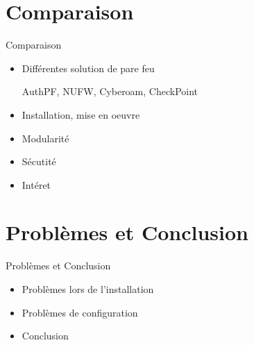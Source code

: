 \documentclass[t,12pt]{beamer}
\begin{document}
\section{Comparaison}                                                    %
\begin{frame}                                                         %
    \begin{center}{\textcolor{grisbleu}{\Large Comparaison}}\end{center} %
    \begin{itemize}                                                   %
	\item Différentes solution de pare feu
\begin{center}AuthPF, NUFW, Cyberoam, CheckPoint\end{center}
	\item Installation, mise en oeuvre
	\item Modularité
        \item Sécutité
        \item Intéret
\end{itemize}
\end{frame}                                                            %


\section{Problèmes et Conclusion}                                                    %
\begin{frame}                                                         %
    \begin{center}{\textcolor{grisbleu}{\Large Problèmes et Conclusion}}\end{center} %
    \begin{itemize}                                                   %
	\item Problèmes lors de l'installation
	\item Problèmes de configuration
	\item Conclusion
\end{itemize}
\end{frame}                                                            %
\end{document}
